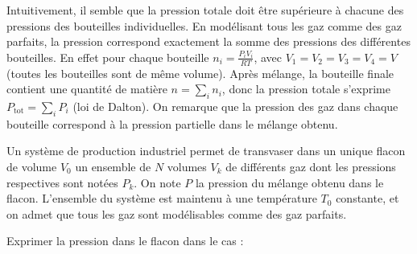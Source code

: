 \reponse{\reponseA{}}

\begin{corrigeNewpage}
Intuitivement, il semble que la pression totale doit être supérieure à chacune des pressions des bouteilles individuelles.  
En modélisant tous les gaz comme des gaz parfaits, la pression correspond exactement la somme des pressions des différentes bouteilles. En effet pour chaque bouteille $n_i=\frac{P_i V_i}{RT}$, avec $V_1=V_2=V_3=V_4=V$ (toutes les bouteilles sont de même volume). Après mélange, la bouteille finale contient une quantité de matière $n=\textstyle\sum_i n_i$, donc la pression totale s'exprime $P_\mathrm{tot}=\textstyle\sum_i P_i$ (loi de Dalton). On remarque que la pression des gaz dans chaque bouteille correspond à la pression partielle dans le mélange obtenu.
\end{corrigeNewpage}


\finEntrainement




\newpage


\hauteurLargeurCadreReponse		{8mm}{5cm}
\typeEntrainement				{} %
\initialisationEntrainement

Un système de production industriel permet de transvaser dans un unique flacon de volume $V_0$ un ensemble de $N$ volumes $V_k$ de différents gaz dont les pressions respectives sont notées $P_k$. On note $P$ la pression du mélange obtenu dans le flacon. L'ensemble du système est maintenu à une température $T_0$ constante, et on admet que tous les gaz sont modélisables comme des gaz parfaits.

Exprimer la pression dans le flacon dans le cas :


